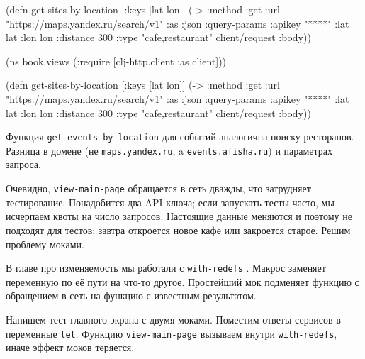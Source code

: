 \pagebreaklarge

\begin{english}
  \begin{clojure}
(defn get-sites-by-location
  [{:keys [lat lon]}]
  (-> {:method :get
       :url "https://maps.yandex.ru/search/v1"
       :as :json
       :query-params {:apikey "****"
                      :lat lat
                      :lon lon
                      :distance 300
                      :type "cafe,restaurant"}}
      client/request
      :body))
  \end{clojure}
\end{english}

\else

\begin{english}
  \begin{clojure}
(ns book.views
  (:require [clj-http.client :as client]))

(defn get-sites-by-location
  [{:keys [lat lon]}]
  (-> {:method :get
       :url "https://maps.yandex.ru/search/v1"
       :as :json
       :query-params {:apikey "****"
                      :lat lat
                      :lon lon
                      :distance 300
                      :type "cafe,restaurant"}}
      client/request
      :body))
  \end{clojure}
\end{english}

\fi

\fi

Функция \verb|get-events-by-location| для событий аналогична поиску
ресторанов. Разница в домене (не \verb|maps.yandex.ru|, a
\verb|events.afisha.ru|) и параметрах запроса.

Очевидно, \verb|view-main-page| обращается в сеть дважды, что затрудняет
тестирование. Понадобится два API-ключа; если запускать тесты часто, мы
исчерпаем квоты на число запросов. Настоящие данные меняются и поэтому не
подходят для тестов: завтра откроется новое кафе или закроется старое. Решим
проблему моками.


В главе про изменяемость мы работали с \verb|with-redefs| .
Макрос заменяет переменную по её пути на что-то другое. Простейший мок подменяет
функцию с обращением в сеть на функцию с известным результатом.

Напишем тест главного экрана с двумя моками. Поместим ответы сервисов в
переменные \verb|let|. Функцию \verb|view-main-page| вызываем внутри
\verb|with-redefs|, иначе эффект моков теряется.

